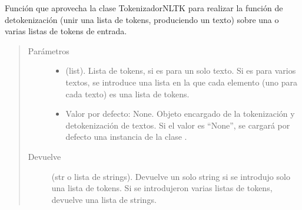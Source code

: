 \documentclass[letterpaper,10pt,openany,spanish]{sphinxmanual}
\begin{document}
\begin{fulllineitems}
\label{\detokenize{funciones/utils:utils.tokenizacion.destokenizar}}
Función que aprovecha la clase TokenizadorNLTK para realizar la función de detokenización     (unir una lista de tokens, produciendo un texto) sobre una o varias listas de tokens de entrada.
\begin{quote}\begin{description}
\item[{Parámetros}] \leavevmode\begin{itemize}
\item {} 
 \textendash{} (list). Lista de tokens, si es para un solo texto. Si es para varios         textos, se introduce una lista en la que cada elemento (uno para cada texto) es una         lista de tokens.

\item {} 
 \textendash{} Valor por defecto: None. Objeto encargado de la tokenización y detokenización         de textos. Si el valor es “None”, se cargará por defecto una instancia de la clase .

\end{itemize}

\item[{Devuelve}] \leavevmode
(str o lista de strings). Devuelve un solo string si se introdujo solo una lista de tokens.         Si se introdujeron varias listas de tokens, devuelve una lista de strings.

\end{description}\end{quote}

\end{fulllineitems}

\end{document}
